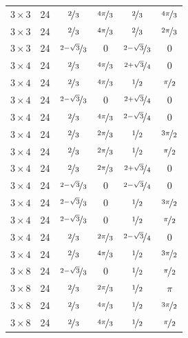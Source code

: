 \documentclass{article}
\begin{document}
\begin{longtable}{cccccc}
$3 \times 3$ & 24 & $\nicefrac{2}{3}$ & $\nicefrac{4\pi}{3}$ & $\nicefrac{2}{3}$ & $\nicefrac{4\pi}{3}$ \\
$3 \times 3$ & 24 & $\nicefrac{2}{3}$ & $\nicefrac{4\pi}{3}$ & $\nicefrac{2}{3}$ & $\nicefrac{2\pi}{3}$ \\
$3 \times 3$ & 24 & $\nicefrac{2-\sqrt{3}}{3}$ & 0 & $\nicefrac{2-\sqrt{3}}{3}$ & 0 \\
$3 \times 4$ & 24 & $\nicefrac{2}{3}$ & $\nicefrac{4\pi}{3}$ & $\nicefrac{2+\sqrt{3}}{4}$ & 0 \\
$3 \times 4$ & 24 & $\nicefrac{2}{3}$ & $\nicefrac{4\pi}{3}$ & $\nicefrac{1}{2}$ & $\nicefrac{\pi}{2}$ \\
$3 \times 4$ & 24 & $\nicefrac{2-\sqrt{3}}{3}$ & 0 & $\nicefrac{2+\sqrt{3}}{4}$ & 0 \\
$3 \times 4$ & 24 & $\nicefrac{2}{3}$ & $\nicefrac{4\pi}{3}$ & $\nicefrac{2-\sqrt{3}}{4}$ & 0 \\
$3 \times 4$ & 24 & $\nicefrac{2}{3}$ & $\nicefrac{2\pi}{3}$ & $\nicefrac{1}{2}$ & $\nicefrac{3\pi}{2}$ \\
$3 \times 4$ & 24 & $\nicefrac{2}{3}$ & $\nicefrac{2\pi}{3}$ & $\nicefrac{1}{2}$ & $\nicefrac{\pi}{2}$ \\
$3 \times 4$ & 24 & $\nicefrac{2}{3}$ & $\nicefrac{2\pi}{3}$ & $\nicefrac{2+\sqrt{3}}{4}$ & 0 \\
$3 \times 4$ & 24 & $\nicefrac{2-\sqrt{3}}{3}$ & 0 & $\nicefrac{2-\sqrt{3}}{4}$ & 0 \\
$3 \times 4$ & 24 & $\nicefrac{2-\sqrt{3}}{3}$ & 0 & $\nicefrac{1}{2}$ & $\nicefrac{3\pi}{2}$ \\
$3 \times 4$ & 24 & $\nicefrac{2-\sqrt{3}}{3}$ & 0 & $\nicefrac{1}{2}$ & $\nicefrac{\pi}{2}$ \\
$3 \times 4$ & 24 & $\nicefrac{2}{3}$ & $\nicefrac{2\pi}{3}$ & $\nicefrac{2-\sqrt{3}}{4}$ & 0 \\
$3 \times 4$ & 24 & $\nicefrac{2}{3}$ & $\nicefrac{4\pi}{3}$ & $\nicefrac{1}{2}$ & $\nicefrac{3\pi}{2}$ \\
$3 \times 8$ & 24 & $\nicefrac{2-\sqrt{3}}{3}$ & 0 & $\nicefrac{1}{2}$ & $\nicefrac{\pi}{2}$ \\
$3 \times 8$ & 24 & $\nicefrac{2}{3}$ & $\nicefrac{2\pi}{3}$ & $\nicefrac{1}{2}$ & $\pi$ \\
$3 \times 8$ & 24 & $\nicefrac{2}{3}$ & $\nicefrac{4\pi}{3}$ & $\nicefrac{1}{2}$ & $\nicefrac{3\pi}{2}$ \\
$3 \times 8$ & 24 & $\nicefrac{2}{3}$ & $\nicefrac{4\pi}{3}$ & $\nicefrac{1}{2}$ & $\nicefrac{\pi}{2}$ \\

\end{longtable}
\end{document}
